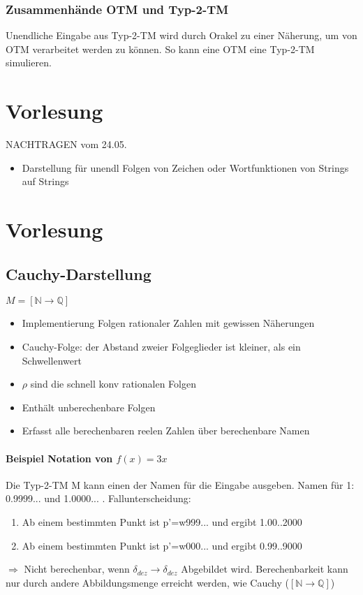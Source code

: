 \documentclass[ngerman]{scrartcl}
\begin{document}
\subsubsection{Zusammenhände OTM und Typ-2-TM}
Unendliche Eingabe aus Typ-2-TM wird durch Orakel zu einer Näherung, um von OTM verarbeitet werden zu können. So kann eine OTM eine Typ-2-TM simulieren. 


\section{Vorlesung}
NACHTRAGEN vom 24.05.
\begin{itemize}
  \item Darstellung für unendl Folgen von Zeichen oder Wortfunktionen von Strings auf Strings
\end{itemize}


\section{Vorlesung}
\subsection{Cauchy-Darstellung}
$ M = [ \mathbb{N} \rightarrow \mathbb{Q} ] $
\begin{itemize}
  \item Implementierung Folgen rationaler Zahlen mit gewissen Näherungen
  \item Cauchy-Folge: der Abstand zweier Folgeglieder ist kleiner, als ein Schwellenwert
  \item $ \rho $ sind die schnell konv rationalen Folgen
  \item Enthält unberechenbare Folgen
  \item Erfasst alle berechenbaren reelen Zahlen über berechenbare Namen 
\end{itemize}
\paragraph{Beispiel Notation von $ f(x) = 3x $}
Die Typ-2-TM M kann einen der Namen für die Eingabe ausgeben. Namen für 1: 0.9999... und 1.0000... . Fallunterscheidung:
\begin{enumerate}
  \item Ab einem bestimmten Punkt ist p'=w999... und ergibt 1.00..2000
  \item Ab einem bestimmten Punkt ist p'=w000... und ergibt 0.99..9000
\end{enumerate}
$ \Rightarrow $ Nicht berechenbar, wenn $ \delta_{dez} \rightarrow \delta_{dez} $ Abgebildet wird. Berechenbarkeit kann nur durch andere Abbildungsmenge erreicht werden, wie Cauchy ($ [\mathbb{N}\rightarrow\mathbb{Q}]$)
\end{document}
